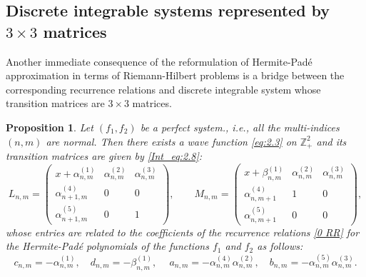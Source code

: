 \documentclass{amsart}
\newtheorem{proposition}[theorem]{Proposition}
\theoremstyle{remark}
\numberwithin{equation}{section}
\begin{document}
\subsection{Discrete integrable systems represented by $3\times 3$ matrices}\label{sec:42}
Another immediate consequence of the reformulation of {Her\-mite-Pad\'e}{} approximation in terms of Riemann-Hilbert problems is a bridge between the corresponding recurrence relations and discrete integrable system whose transition matrices are $3\times 3$ matrices.
\begin{proposition}\label{Pr2}
Let $(f_1,f_2)$ be a perfect system., i.e., all the multi-indices $(n,m)$ are normal. 
Then there exists a wave function \eqref{eq:2.3} on ${{\mathbb Z}}_+^2$ and its
transition matrices are given by \eqref{Int_eq:2.8}:
\begin{equation*}
    L_{n,m}  = \begin{pmatrix}
                  x+ \alpha_{n,m}^{(1)}& \alpha_{n,m}^{(2)} & \alpha_{n,m}^{(3)} \\
                  \alpha_{n+1,m}^{(4)} & 0 &  0 \\
                  \alpha_{n+1,m}^{(5)} & 0 &  1
                 \end{pmatrix},\qquad
    M_{n,m}  = \begin{pmatrix}
                  x+\beta_{n,m}^{(1)} & \alpha_{n,m}^{(2)} & \alpha_{n,m}^{(3)} \\
                  \alpha_{n,m+1}^{(4)} & 1 &  0 \\
                  \alpha_{n,m+1}^{(5)} & 0 &  0
                 \end{pmatrix},
\end{equation*}
whose entries are related to the coefficients of the recurrence relations \eqref{0 RR} for the {Her\-mite-Pad\'e}{} polynomials of the
functions $f_1$ and $f_2$ as follows:
\begin{equation} \label{abcd}
    c_{n,m} = -\alpha_{n,m}^{(1)}, \quad
    d_{n,m} = -\beta_{n,m}^{(1)}, \quad
\   a_{n,m} = -\alpha_{n,m}^{(4)}\alpha_{n,m}^{(2)}, \quad b_{n,m} = -\alpha_{n,m}^{(5)}\alpha_{n,m}^{(3)}.
\end{equation}
\end{proposition}
\end{document}
